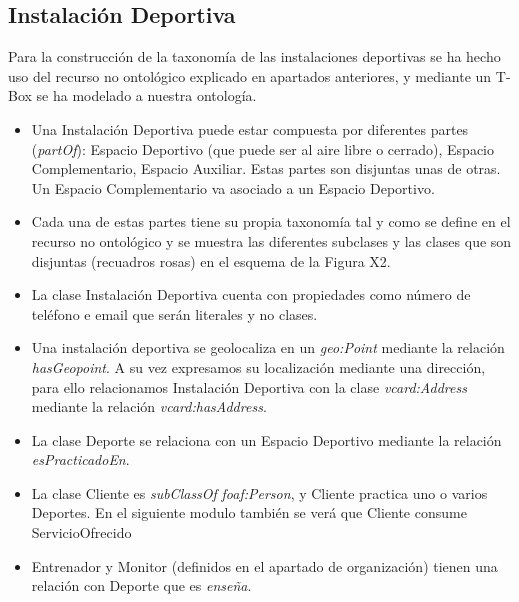 \documentclass[a4paper,12pt]{article}
\begin{document}
	\subsection{Instalación Deportiva}
	
	Para la construcción de la taxonomía de las instalaciones deportivas se ha hecho uso del recurso
no ontológico explicado en apartados anteriores, y mediante un T-Box se ha modelado a nuestra
ontología.
	
	\begin{itemize}
		\item Una Instalación Deportiva puede estar compuesta por diferentes partes (\textit{partOf}):
Espacio Deportivo (que puede ser al aire libre o cerrado), Espacio Complementario,
Espacio Auxiliar. Estas partes son disjuntas unas de otras. Un Espacio
Complementario va asociado a un Espacio Deportivo.
		\item Cada una de estas partes tiene su propia taxonomía tal y como se define en el recurso no
	ontológico y se muestra las diferentes subclases y las clases que son disjuntas (recuadros
rosas) en el esquema de la Figura X2.
		\item La clase Instalación Deportiva cuenta con propiedades como número de teléfono e email que
serán literales y no clases.
		\item Una instalación deportiva se geolocaliza en un \textit{geo:Point} mediante la relación
\textit{hasGeopoint}. A su vez expresamos su localización mediante una dirección, para ello
relacionamos Instalación Deportiva con la clase \textit{vcard:Address} mediante la relación
\textit{vcard:hasAddress}.
		\item La clase Deporte se relaciona con un Espacio Deportivo mediante la relación
\textit{esPracticadoEn}.
		\item La clase Cliente es \textit{subClassOf} \textit{foaf:Person}, y Cliente practica uno o varios Deportes.
En el siguiente modulo también se verá que Cliente consume ServicioOfrecido
		\item Entrenador y Monitor (definidos en el apartado de organización) tienen una relación
	con Deporte que es \textit{enseña}.
	\end{itemize}
\end{document}
